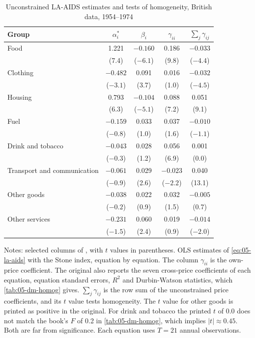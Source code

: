 \begin{table}[htbp]
\centering
\caption{Unconstrained LA-AIDS estimates and tests of homogeneity, British data, 1954--1974}
\label{tab:05-dm-table1}
\small
\begin{tabular}{lcccc}
\toprule
Group & $\alpha_i^*$ & $\beta_i$ & $\gamma_{ii}$ & $\sum_j\gamma_{ij}$ \\
\midrule
Food & 1.221 & $-0.160$ & 0.186 & $-0.033$ \\
 & (7.4) & ($-6.1$) & (9.8) & ($-4.4$) \\
Clothing & $-0.482$ & 0.091 & 0.016 & $-0.032$ \\
 & ($-3.1$) & (3.7) & (1.0) & ($-4.5$) \\
Housing & 0.793 & $-0.104$ & 0.088 & 0.051 \\
 & (6.3) & ($-5.1$) & (7.2) & (9.1) \\
Fuel & $-0.159$ & 0.033 & 0.037 & $-0.010$ \\
 & ($-0.8$) & (1.0) & (1.6) & ($-1.1$) \\
Drink and tobacco & $-0.043$ & 0.028 & 0.056 & 0.001 \\
 & ($-0.3$) & (1.2) & (6.9) & (0.0) \\
Transport and communication & $-0.061$ & 0.029 & $-0.023$ & 0.040 \\
 & ($-0.9$) & (2.6) & ($-2.2$) & (13.1) \\
Other goods & $-0.038$ & 0.022 & 0.032 & $-0.005$ \\
 & ($-0.2$) & (0.9) & (1.5) & (0.7) \\
Other services & $-0.231$ & 0.060 & 0.019 & $-0.014$ \\
 & ($-1.5$) & (2.4) & (0.9) & ($-2.0$) \\
\bottomrule
\end{tabular}

\smallskip
\begin{minipage}{0.94\textwidth}
\footnotesize Notes: selected columns of \citet[Table~1]{DeatonMuellbauer1980a}, with $t$ values in
parentheses. OLS estimates of \eqref{eq:05-la-aids} with the Stone index, equation by equation. The column
$\gamma_{ii}$ is the own-price coefficient. The original also reports the seven cross-price coefficients
of each equation, equation standard errors, $R^2$ and Durbin-Watson statistics, which
\cref{tab:05-dm-homog} gives. $\sum_j\gamma_{ij}$ is the row sum of the unconstrained price
coefficients, and its $t$ value tests homogeneity. The $t$ value for other goods is printed as positive in
the original. For drink and tobacco the printed $t$ of 0.0 does not match the book's $F$ of 0.2 in
\cref{tab:05-dm-homog}, which implies $|t| \approx 0.45$. Both are far from significance. Each equation
uses $T = 21$ annual observations.
\end{minipage}
\end{table}

